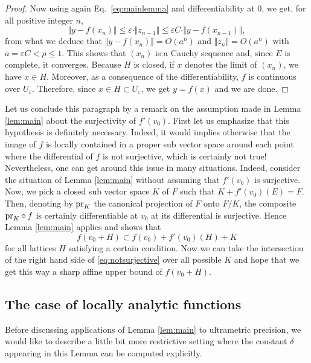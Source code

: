\documentclass{lms}
\begin{document}
\begin{proof}
Now using again Eq.~\eqref{eq:mainlemma} and differentiability at $0$,
we get, for all positive integer $n$,
$$\Vert y  - f(x_n) \Vert 
\leq \varepsilon \cdot \Vert z_{n-1} \Vert \leq \varepsilon C \cdot \Vert 
y - f(x_{n-1}) \Vert,$$
from what we deduce that $\Vert y - f(x_n) \Vert = O(a^n)$ and 
$\Vert z_n \Vert = O(a^n)$ with $a = \varepsilon C < \rho \leq 1$. 
This shows that $(x_n)$ is a Cauchy sequence and, since $E$ is complete, 
it converges. Because $H$ is closed, if $x$ denotes the limit of 
$(x_n)$, we have $x \in H$. Moreover, as a consequence of the 
differentiability, $f$ is continuous over $U_\varepsilon$. Therefore, 
since $x \in H \subset U_\varepsilon$, we get $y=f(x)$ and we are done.
\end{proof}

Let us conclude this paragraph by a remark on the assumption made in 
Lemma \ref{lem:main} about the surjectivity of $f'(v_0)$. First let us 
emphasize that this hypothesis is definitely necessary. Indeed, it would 
implies otherwise that the image of $f$ is locally contained in a proper 
sub vector space around each point where the differential of $f$ is not 
surjective, which is certainly not true! Nevertheless, one can get 
around this issue in many situations. Indeed, consider the situation of 
Lemma \ref{lem:main} without assuming that $f'(v_0)$ is surjective. Now, 
we pick a closed sub vector space $K$ of $F$ such that $K + f'(v_0)(E) = 
F$. Then, denoting by $\text{\rm pr}_K$ the canonical projection of $F$ onto 
$F/K$, the composite $\text{\rm pr}_K \circ f$ is certainly differentiable at 
$v_0$ at its differential is surjective. Hence Lemma \ref{lem:main}
applies and shows that
\begin{equation}
\label{eq:notsurjective}
f(v_0 + H) \subset f(v_0) + f'(v_0)(H) + K
\end{equation}
for all lattices $H$ satisfying a certain condition. Now we can take
the intersection of the right hand side of \eqref{eq:notsurjective} 
over all possible $K$ and hope that we get this way a sharp affine upper 
bound of $f(v_0 + H)$.

\subsection{The case of locally analytic functions}
\label{ssec:locanalytic}


Before discussing applications of Lemma \ref{lem:main} to ultrametric 
precision, we would like to describe a little bit more restrictive 
setting where the constant $\delta$ appearing in this Lemma can be 
computed explicitly.
\end{document}
